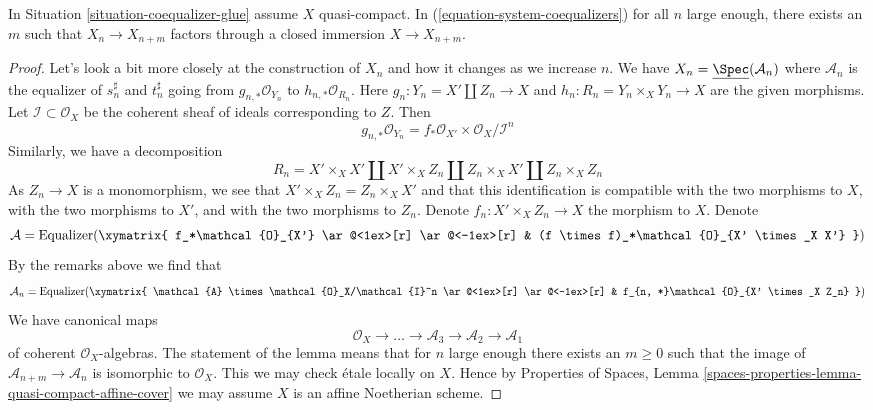 %
\begin{lemma}
\label{lemma-essentially-constant}
In Situation \ref{situation-coequalizer-glue} assume $X$ quasi-compact.
In (\ref{equation-system-coequalizers}) for all $n$ large enough, there
exists an $m$ such that $X_n \to X_{n + m}$ factors through a
closed immersion $X \to X_{n + m}$.
\end{lemma}

\begin{proof}
Let's look a bit more closely at the construction of $X_n$
and how it changes as we increase $n$. We have
$X_n = \underline{\Spec}(\mathcal{A}_n)$
where $\mathcal{A}_n$ is the equalizer of $s_n^\sharp$ and $t_n^\sharp$
going from $g_{n , *}\mathcal{O}_{Y_n}$ to $h_{n, *}\mathcal{O}_{R_n}$.
Here $g_n : Y_n = X' \amalg Z_n \to X$ and $h_n : R_n = Y_n \times_X Y_n \to X$
are the given morphisms. Let $\mathcal{I} \subset \mathcal{O}_X$ be the
coherent sheaf of ideals corresponding to $Z$. Then
$$
g_{n, *}\mathcal{O}_{Y_n} =
f_*\mathcal{O}_{X'} \times \mathcal{O}_X/\mathcal{I}^n
$$
Similarly, we have a decomposition
$$
R_n = X' \times_X X' \amalg X' \times_X Z_n \amalg
Z_n \times_X X' \amalg Z_n \times_X Z_n
$$
As $Z_n \to X$ is a monomorphism, we see that
$X' \times_X Z_n = Z_n \times_X X'$ and that this identification
is compatible with the two morphisms to $X$, with the two morphisms to
$X'$, and with the two morphisms to $Z_n$.
Denote $f_n : X' \times_X Z_n \to X$ the morphism to $X$.
Denote
$$
\mathcal{A} = \text{Equalizer}(
\xymatrix{
f_*\mathcal{O}_{X'} \ar@<1ex>[r] \ar@<-1ex>[r] &
(f \times f)_*\mathcal{O}_{X' \times_X X'}
}
)
$$
By the remarks above we find that
$$
\mathcal{A}_n =
\text{Equalizer}(
\xymatrix{
\mathcal{A} \times \mathcal{O}_X/\mathcal{I}^n \ar@<1ex>[r] \ar@<-1ex>[r] &
f_{n, *}\mathcal{O}_{X' \times_X Z_n}
}
)
$$
We have canonical maps
$$
\mathcal{O}_X \to \ldots \to \mathcal{A}_3 \to \mathcal{A}_2 \to \mathcal{A}_1
$$
of coherent $\mathcal{O}_X$-algebras. The statement of the lemma means that
for $n$ large enough there exists an $m \geq 0$ such that the image of
$\mathcal{A}_{n + m} \to \mathcal{A}_n$ is isomorphic to $\mathcal{O}_X$.
This we may check \'etale locally on $X$. Hence by Properties of Spaces,
Lemma \ref{spaces-properties-lemma-quasi-compact-affine-cover}
we may assume $X$ is an affine Noetherian scheme.


\end{proof}
